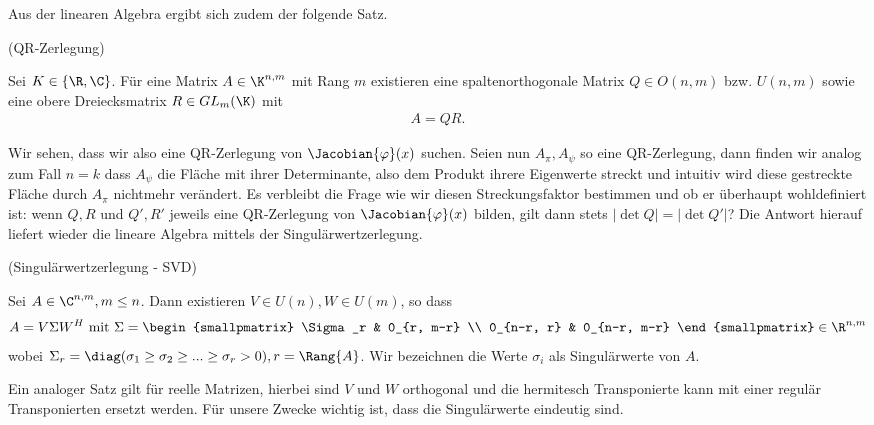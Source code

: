 \documentclass[a4paper,11pt]{article}
\begin{document}
Aus der linearen Algebra ergibt sich zudem der folgende Satz.
\begin{theorem}(QR-Zerlegung)

    Sei $K \in \{\R, \C\}$. Für eine Matrix $A \in \K^{n, m}$ mit Rang $m$ existieren eine spaltenorthogonale Matrix $Q \in O(n, m)$ bzw. $U(n, m)$ sowie eine obere Dreiecksmatrix $R \in GL_m(\K)$ mit
    \begin{align}
        A = QR.
    \end{align}
\end{theorem}
Wir sehen, dass wir also eine QR-Zerlegung von $\Jacobian{\varphi}(x)$ suchen.
Seien nun $A_\pi, A_\psi$ so eine QR-Zerlegung, dann finden wir analog zum Fall $n=k$ dass $A_\psi$ die Fläche mit ihrer Determinante, also dem Produkt ihrere Eigenwerte streckt und intuitiv wird diese gestreckte Fläche durch $A_\pi$ nichtmehr verändert. Es verbleibt die Frage wie wir diesen Streckungsfaktor bestimmen und ob er überhaupt wohldefiniert ist: wenn $Q, R$ und $Q', R'$ jeweils eine QR-Zerlegung von $\Jacobian{\varphi}(x)$ bilden, gilt dann stets $|\det Q| = |\det Q'|$? Die Antwort hierauf liefert wieder die lineare Algebra mittels der Singulärwertzerlegung.
\begin{theorem}{(Singulärwertzerlegung - SVD)}\label{theo:svd}

    Sei $A \in \C^{n,m}, m \leq n$. Dann existieren $V \in U(n), W \in U(m)$, so dass
    \begin{align}
        A = V \Sigma W^H \text{ mit } \Sigma = \begin{smallpmatrix}
            \Sigma_r & 0_{r, m-r} \\
            0_{n-r, r} & 0_{n-r, m-r}
        \end{smallpmatrix} \in \R^{n,m}
    \end{align}
    wobei $\Sigma_r = \diag(\sigma_1 \geq \sigma_2 \geq ... \geq \sigma_r > 0), r = \Rang{A}$. Wir bezeichnen die Werte $\sigma_i$ als Singulärwerte von $A$.
\end{theorem}
Ein analoger Satz gilt für reelle Matrizen, hierbei sind $V$ und $W$ orthogonal und die hermitesch Transponierte kann mit einer regulär Transponierten ersetzt werden.
Für unsere Zwecke wichtig ist, dass die Singulärwerte eindeutig sind.
\end{document}
